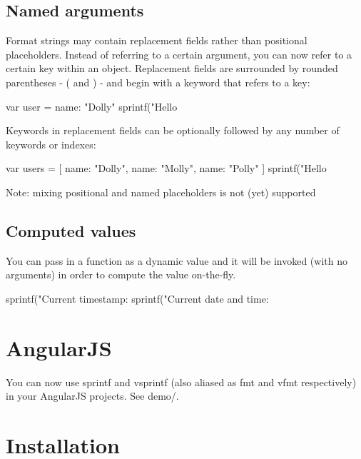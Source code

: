 \subsection*{Named arguments}

Format strings may contain replacement fields rather than positional placeholders. Instead of referring to a certain argument, you can now refer to a certain key within an object. Replacement fields are surrounded by rounded parentheses -\/ {\ttfamily (} and {\ttfamily )} -\/ and begin with a keyword that refers to a key\+: \begin{DoxyVerb}var user = {
    name: "Dolly"
}
sprintf("Hello %
\end{DoxyVerb}
 Keywords in replacement fields can be optionally followed by any number of keywords or indexes\+: \begin{DoxyVerb}var users = [
    {name: "Dolly"},
    {name: "Molly"},
    {name: "Polly"}
]
sprintf("Hello %
\end{DoxyVerb}
 Note\+: mixing positional and named placeholders is not (yet) supported

\subsection*{Computed values}

You can pass in a function as a dynamic value and it will be invoked (with no arguments) in order to compute the value on-\/the-\/fly. \begin{DoxyVerb}sprintf("Current timestamp: %
sprintf("Current date and time: %
\end{DoxyVerb}


\section*{Angular\+J\+S}

You can now use {\ttfamily sprintf} and {\ttfamily vsprintf} (also aliased as {\ttfamily fmt} and {\ttfamily vfmt} respectively) in your Angular\+J\+S projects. See {\ttfamily demo/}.

\section*{Installation}


